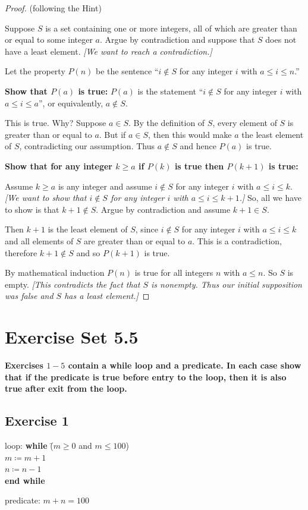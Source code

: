 \documentclass[14pt]{extarticle}
\newcommand{\cy}{\color{cyan}}
\begin{document}
\begin{proof}
(following the Hint)

Suppose $S$ is a set containing one or more integers, all of which are greater than or equal to some integer $a$.
Argue by contradiction and suppose that $S$ does not have a least element. {\it [We want to reach a contradiction.]}

Let the property $P(n)$ be the sentence ``$i \notin S$ for any integer $i$ with $a \leq i \leq n$.''

{\bf Show that $P(a)$ is true:} $P(a)$ is the statement 
``$i \notin S$ for any integer $i$ with $a \leq i \leq a$'', or equivalently, $a \notin S$.

This is true. Why? Suppose $a \in S$. By the definition of $S$, every element of $S$ is greater than or equal to $a$. 
But if $a \in S$, then this would make $a$ the least element of $S$, contradicting our assumption. 
Thus $a \notin S$ and hence $P(a)$ is true.

{\bf Show that for any integer $k \geq a$ if $P(k)$ is true then $P(k+1)$ is true:}

Assume $k \geq a$ is any integer and assume $i \notin S$ for any integer $i$ with $a \leq i \leq k$.
{\it [We want to show that $i \notin S$ for any integer $i$ with $a \leq i \leq k+1$.]}
So, all we have to show is that $k+1 \notin S$. Argue by contradiction and assume $k+1 \in S$.

Then $k+1$ is the least element of $S$, since $i \notin S$ for any integer $i$ with $a \leq i \leq k$ and all elements
of $S$ are greater than or equal to $a$. This is a contradiction, therefore $k+1 \notin S$ and so $P(k+1)$ is true.

By mathematical induction $P(n)$ is true for all integers $n$ with $a \leq n$. So $S$ is empty.
{\it [This contradicts the fact that $S$ is nonempty. Thus our initial supposition was false and $S$ has a least element.]}
\end{proof}

\section{Exercise Set 5.5}

{\bf \cy Exercises $1-5$ contain a while loop and a predicate. In each case show that if the predicate is true 
before entry to the loop, then it is also true after exit from the loop.}

\subsection{Exercise 1}
\begin{tabbing}
loop: \hspace{1cm} 
\= {\bf while} \= ($m \geq 0$ and $m \leq 100$) \\
\>             \> $m \coloneqq m + 1$ \\
\>             \> $n \coloneqq n - 1$ \\
\> {\bf end while} 
\end{tabbing}
predicate: $m + n = 100$
\end{document}
